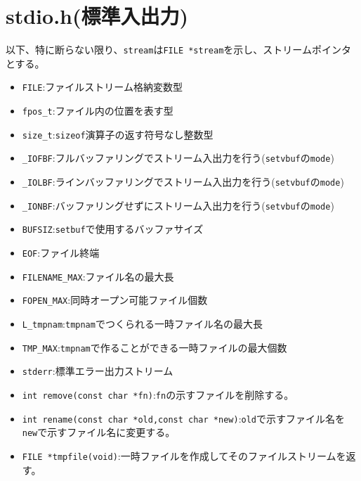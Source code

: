 \section{stdio.h(標準入出力)}
以下、特に断らない限り、\verb|stream|は\verb|FILE *stream|を示し、ストリームポインタとする。
\begin{itemize}
\item \verb|FILE|:ファイルストリーム格納変数型
\item \verb|fpos_t|:ファイル内の位置を表す型
\item \verb|size_t|:\verb|sizeof|演算子の返す符号なし整数型
\item \verb|_IOFBF|:フルバッファリングでストリーム入出力を行う(\verb|setvbuf|の\verb|mode|)
\item \verb|_IOLBF|:ラインバッファリングでストリーム入出力を行う(\verb|setvbuf|の\verb|mode|)
\item \verb|_IONBF|:バッファリングせずにストリーム入出力を行う(\verb|setvbuf|の\verb|mode|)
\item \verb|BUFSIZ|:\verb|setbuf|で使用するバッファサイズ
\item \verb|EOF|:ファイル終端
\item \verb|FILENAME_MAX|:ファイル名の最大長
\item \verb|FOPEN_MAX|:同時オープン可能ファイル個数
\item \verb|L_tmpnam|:\verb|tmpnam|でつくられる一時ファイル名の最大長
\item \verb|TMP_MAX|:\verb|tmpnam|で作ることができる一時ファイルの最大個数
\item \verb|stderr|:標準エラー出力ストリーム
\item \verb|int remove(const char *fn)|:\verb|fn|の示すファイルを削除する。
\item \verb|int rename(const char *old,const char *new)|:\verb|old|で示すファイル名を\verb|new|で示すファイル名に変更する。
\item \verb|FILE *tmpfile(void)|:一時ファイルを作成してそのファイルストリームを返す。

\end{itemize}
